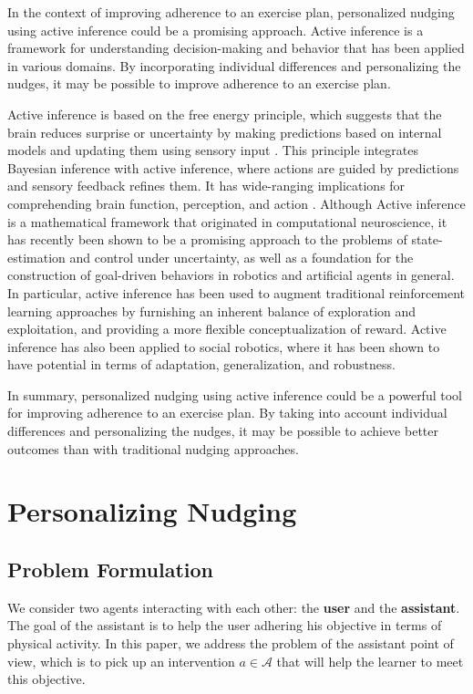 \documentclass[manuscript,screen,review]{acmart}
\begin{document}
In the context of improving adherence to an exercise plan, personalized nudging using active inference could be a promising approach. Active inference is a framework for understanding decision-making and behavior that has been applied in various domains. By incorporating individual differences and personalizing the nudges, it may be possible to improve adherence to an exercise plan.

Active inference is based on the free energy principle, which suggests that the brain reduces surprise or uncertainty
 by making predictions based on internal models and updating them using sensory input \cite{mann2022free}. This
 principle integrates  Bayesian inference with active inference, where actions are guided by predictions and sensory feedback refines them.
  It has wide-ranging implications for comprehending brain function, perception, and action
  \cite{bruineberg2018anticipating}. Although Active inference is a mathematical framework that originated in
  computational neuroscience, it has recently been shown to be a promising approach to the problems of
  state-estimation and control under uncertainty, as well as a foundation for the construction of goal-driven
  behaviors in robotics and artificial agents in general\cite{lanillos2021active}. In particular, active inference
  has been used to augment traditional reinforcement learning approaches by furnishing an inherent balance of
  exploration and exploitation, and providing a more flexible conceptualization of
  reward\cite{tschantz2020reinforcement}. Active inference has also been applied to social robotics, where it has
  been shown to have potential in terms of adaptation, generalization, and robustness\cite{da2022active}.

In summary, personalized nudging using active inference could be a powerful tool for improving adherence to an exercise plan. By taking into account individual differences and personalizing the nudges, it may be possible to achieve better outcomes than with traditional nudging approaches.

\section{Personalizing Nudging}

\subsection{Problem Formulation}

We consider two agents interacting with each other: the \textbf{user} and the \textbf{assistant}.
The goal of the assistant is to help the user adhering his objective in terms of physical activity. In this paper, we
 address the problem of the assistant point of view, which is to pick up an intervention $a \in \mathcal{A}$ that will
 help the learner to meet this objective.
\end{document}
